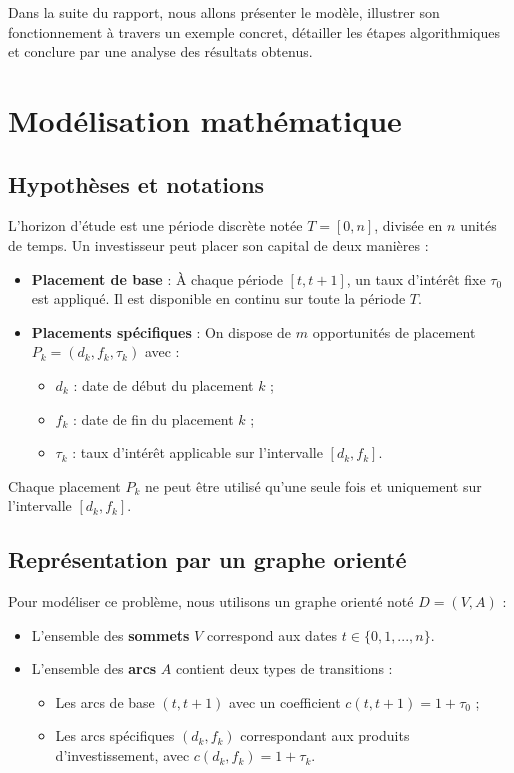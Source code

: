 \documentclass[a4paper,11pt]{article}
\begin{document}
Dans la suite du rapport, nous allons présenter le modèle, illustrer son fonctionnement à travers un exemple concret, détailler les étapes algorithmiques et conclure par une analyse des résultats obtenus.


    

\section{Modélisation mathématique}
\subsection{Hypothèses et notations}

L’horizon d’étude est une période discrète notée $T = [0, n]$, divisée en $n$ unités de temps. Un investisseur peut placer son capital de deux manières :
\begin{itemize}
	\item \textbf{Placement de base} : À chaque période $[t, t+1]$, un taux d’intérêt fixe $\tau_0$ est appliqué. Il est disponible en continu sur toute la période $T$.
	\item \textbf{Placements spécifiques} : On dispose de $m$ opportunités de placement $P_k = (d_k, f_k, \tau_k)$ avec :
	      \begin{itemize}
	      	\item $d_k$ : date de début du placement $k$ ;
	      	\item $f_k$ : date de fin du placement $k$ ;
	      	\item $\tau_k$ : taux d’intérêt applicable sur l’intervalle $[d_k, f_k]$.
	      \end{itemize}
\end{itemize}

Chaque placement $P_k$ ne peut être utilisé qu’une seule fois et uniquement sur l’intervalle $[d_k, f_k]$.
    

\subsection{Représentation par un graphe orienté}

Pour modéliser ce problème, nous utilisons un graphe orienté noté $D = (V, A)$ :

\begin{itemize}
	\item L’ensemble des \textbf{sommets} $V$ correspond aux dates $t \in \{0, 1, ..., n\}$.
	\item L’ensemble des \textbf{arcs} $A$ contient deux types de transitions :
	      \begin{itemize}
	      	\item Les arcs de base $(t, t+1)$ avec un coefficient $c(t, t+1) = 1 + \tau_0$ ;
	      	\item Les arcs spécifiques $(d_k, f_k)$ correspondant aux produits d’investissement, avec $c(d_k, f_k) = 1 + \tau_k$.
	      \end{itemize}
\end{itemize}
\end{document}
